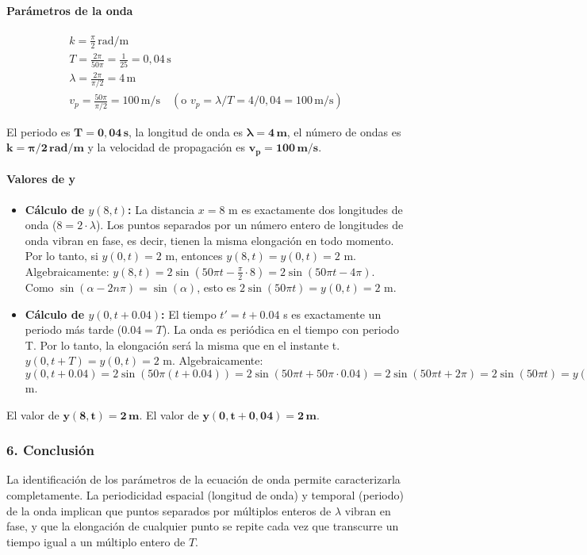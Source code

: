 \paragraph*{Parámetros de la onda}
\begin{gather}
    k = \frac{\pi}{2} \, \text{rad/m} \\
    T = \frac{2\pi}{50\pi} = \frac{1}{25} = 0,04 \, \text{s} \\
    \lambda = \frac{2\pi}{\pi/2} = 4 \, \text{m} \\
    v_p = \frac{50\pi}{\pi/2} = 100 \, \text{m/s} \quad (\text{o } v_p = \lambda/T = 4/0,04 = 100 \, \text{m/s})
\end{gather}
\begin{cajaresultado}
El periodo es $\boldsymbol{T=0,04\,s}$, la longitud de onda es $\boldsymbol{\lambda=4\,m}$, el número de ondas es $\boldsymbol{k=\pi/2 \, rad/m}$ y la velocidad de propagación es $\boldsymbol{v_p=100\,m/s}$.
\end{cajaresultado}
\paragraph*{Valores de y}
\begin{itemize}
    \item \textbf{Cálculo de $y(8,t)$:}
    La distancia $x=8$ m es exactamente dos longitudes de onda ($8 = 2 \cdot \lambda$). Los puntos separados por un número entero de longitudes de onda vibran en fase, es decir, tienen la misma elongación en todo momento. Por lo tanto, si $y(0,t)=2$ m, entonces $y(8,t)=y(0,t)=2$ m.
    Algebraicamente: $y(8,t) = 2\sin(50\pi t - \frac{\pi}{2} \cdot 8) = 2\sin(50\pi t - 4\pi)$. Como $\sin(\alpha - 2n\pi) = \sin(\alpha)$, esto es $2\sin(50\pi t) = y(0,t) = 2$ m.
    \item \textbf{Cálculo de $y(0,t+0.04)$:}
    El tiempo $t'=t+0.04$ s es exactamente un periodo más tarde ($0.04 = T$). La onda es periódica en el tiempo con periodo T. Por lo tanto, la elongación será la misma que en el instante t. $y(0,t+T) = y(0,t) = 2$ m.
    Algebraicamente: $y(0,t+0.04) = 2\sin(50\pi(t+0.04)) = 2\sin(50\pi t + 50\pi \cdot 0.04) = 2\sin(50\pi t + 2\pi) = 2\sin(50\pi t) = y(0,t) = 2$ m.
\end{itemize}
\begin{cajaresultado}
    El valor de $\boldsymbol{y(8,t) = 2 \, m}$. El valor de $\boldsymbol{y(0,t+0,04) = 2 \, m}$.
\end{cajaresultado}

\subsubsection*{6. Conclusión}
\begin{cajaconclusion}
La identificación de los parámetros de la ecuación de onda permite caracterizarla completamente. La periodicidad espacial (longitud de onda) y temporal (periodo) de la onda implican que puntos separados por múltiplos enteros de $\lambda$ vibran en fase, y que la elongación de cualquier punto se repite cada vez que transcurre un tiempo igual a un múltiplo entero de $T$.
\end{cajaconclusion}

